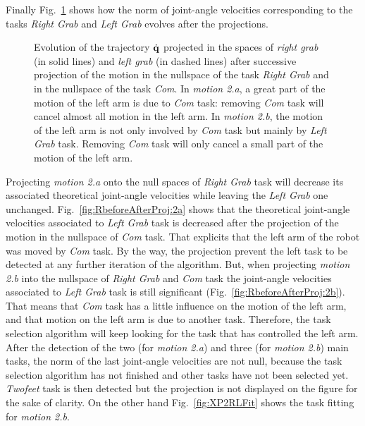 \documentclass[journal]{IEEEtran}
\begin{document}
Finally Fig.~\ref{fig:RbeforeAfterProj} shows how the norm of joint-angle velocities corresponding to the tasks
\emph{Right Grab} and \emph{Left Grab} evolves after the projections.
\begin{figure}[t]
\centering
  \subfigure[Motion 2.a]{
  \resizebox{.48\textwidth}{!} {
      
    }
  \label{fig:RbeforeAfterProj:2a}
  }
  \subfigure[Motion 2.b]{
  \resizebox{.48\textwidth}{!} {
      
  }
  \label{fig:RbeforeAfterProj:2b}
  }
  \caption{Evolution of the trajectory $\dot{{\mathbf{q}}}$ projected in the spaces of
  \emph{right grab} (in solid lines) and 
  \emph{left grab} (in dashed lines) after
  successive projection of the motion in the nullspace of the task \emph{Right Grab} and in the nullspace
  of the task \emph{Com}. In \emph{motion 2.a}, a great part of the motion of the left arm is due to 
  \emph{Com} task: removing \emph{Com} task will cancel almost all motion in the left arm.
  In \emph{motion 2.b}, the motion of the left arm is not only involved by \emph{Com} task
  but mainly by \emph{Left Grab} task. Removing \emph{Com} task will only
  cancel a small part of the motion of the left arm.}
\label{fig:RbeforeAfterProj}
\end{figure}
Projecting \emph{motion 2.a} onto the null spaces of
\emph{Right Grab} task will decrease its associated theoretical joint-angle velocities while leaving the
\emph{Left Grab} one unchanged. Fig.~\ref{fig:RbeforeAfterProj:2a} shows
that the theoretical joint-angle velocities associated to 
\emph{Left Grab} task is decreased after the projection of the motion in
the nullspace of \emph{Com} task.  That explicits that
the left arm of the robot was moved by \emph{Com} task.
By the way, the projection prevent the left task to be detected at any further iteration of
the algorithm.
But, when projecting \emph{motion 2.b} into the nullspace of \emph{Right Grab}
and \emph{Com} task the joint-angle velocities associated to \emph{Left Grab} task
is still significant (Fig.~\ref{fig:RbeforeAfterProj:2b}). That means that 
\emph{Com} task has a little influence on the
motion of the left arm, and that motion on the left arm is due
to another task. Therefore, the task selection algorithm will keep looking
for the task that has controlled the left arm.
After the detection of the two (for \emph{motion 2.a}) and three (for \emph{motion 2.b}) main tasks,
the norm of the last joint-angle velocities are not null, because 
the task selection algorithm has not finished and other tasks have not been selected yet.
\emph{Twofeet} task is then detected but the projection is not displayed on the figure for the sake of clarity.
On the other hand Fig.~\ref{fig:XP2RLFit} shows the task fitting for \emph{motion 2.b}.
\end{document}
